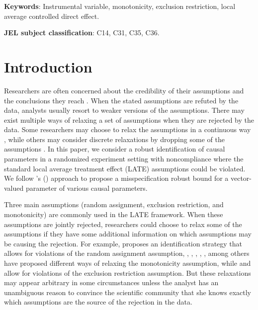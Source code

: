 \documentclass[12pt]{article}
\theoremstyle{plain}
\theoremstyle{definition}
\theoremstyle{remark}
\begin{document}
\begin{abstract}
    
\end{abstract}

 \maketitle
{\footnotesize \textbf{Keywords}: Instrumental variable, monotonicity, exclusion restriction, local average controlled direct effect.  

\textbf{JEL subject classification}: C14, C31, C35, C36.}

\clearpage

\section{Introduction}
\label{sec:intro}

Researchers are often concerned about the credibility of their assumptions and the conclusions they reach \citep[see \textit{The Law of Decreasing Credibility} in][]{manski2003partial, manski2011policy}. When the stated assumptions are refuted by the data, analysts usually resort to weaker versions of the assumptions. There may exist multiple ways of relaxing a set of assumptions when they are rejected by the data. Some researchers may choose to relax the assumptions in a continuous way \citep[as in][]{Masten2021SalvagingModels}, while others may consider discrete relaxations by dropping some of the assumptions \citep[as in][]{li2024discordant}. In this paper, we consider a robust identification of causal parameters in a randomized experiment setting with noncompliance where the standard local average treatment effect (LATE) assumptions could be violated. We follow \citeauthor{li2024discordant}'s (\citeyear{li2024discordant}) approach to propose a misspecification robust bound for a vector-valued parameter of various causal parameters. 

Three main assumptions (random assignment, exclusion restriction, and monotonicity) are commonly used in the LATE framework. When these assumptions are jointly rejected, researchers could choose to relax some of the assumptions if they have some additional information on which assumptions may be causing the rejection. For example, \cite{Kedagni2023IdentifyingTypes} proposes an identification strategy that allows for violations of the random assignment assumption, \cite{deChaisemartin2017ToleratingMonotonicity}, \cite{Huber2017SharpNoncompliance}, \cite{small2017instrumental}, \cite{Noack2021SensitivityAssumption}, \cite{dahl2023never}, among others have proposed different ways of relaxing the monotonicity assumption, while \cite{cai2008bounds} and \cite{flores2013partial} allow for violations of the exclusion restriction assumption. But these relaxations may appear arbitrary in some circumstances unless the analyst has an unambiguous reason to convince the scientific community that she knows exactly which assumptions are the source of the rejection in the data. 
\end{document}
